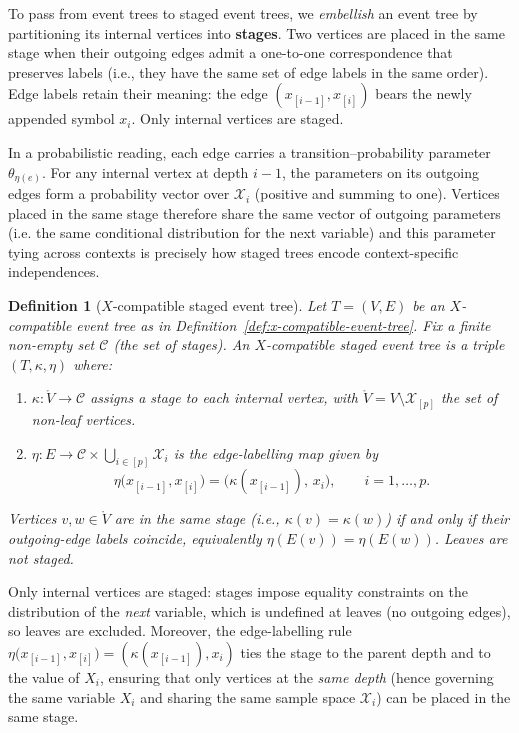 \documentclass[preprint,12pt]{elsarticle}
\newtheorem{mydef}{Definition}
\begin{document}
To pass from event trees to staged event trees, we \textit{embellish} an event tree by partitioning its internal vertices into \textbf{stages}. Two vertices are placed in the same stage when their outgoing edges admit a one-to-one correspondence that preserves labels (i.e., they have the same set of edge labels in the same order). Edge labels retain their meaning: the edge $(x_{[i-1]},x_{[i]})$ bears the newly appended symbol $x_i$. Only internal vertices are staged.


In a probabilistic reading, each edge carries a transition–probability parameter  $\theta_{\eta(e)}$. For any internal vertex at depth $i-1$, the parameters on its outgoing edges form a probability vector over $\mathcal{X}_i$ (positive and summing to one). Vertices placed in the same stage therefore share the same vector of outgoing parameters  (i.e. the same conditional distribution for the next variable) and this parameter tying across contexts is precisely how staged trees encode context-specific independences.


\begin{mydef}[$X$-compatible staged event tree]
\label{def:x-compatible-staged}
Let $T=(V,E)$ be an $X$-compatible event tree as in Definition~\ref{def:x-compatible-event-tree}. Fix a finite non-empty set $\mathcal C$ (the set of stages). An \textnormal{$X$-compatible staged event tree} is a triple $(T,\kappa,\eta)$ where:
\begin{enumerate}
\item $\kappa: \mathring{V} \to \mathcal C$ assigns a stage to each internal vertex, with $\mathring{V}=V\setminus\mathcal X_{[p]}$ {the set of non-leaf vertices}.
\item $\eta: E \to \mathcal C \times \bigcup_{i\in[p]}\mathcal X_i$ is the edge-labelling map given by
\[
\eta\bigl(x_{[i-1]},x_{[i]}\bigr)=\bigl(\kappa(x_{[i-1]}),\,x_i\bigr),\qquad i=1,\ldots,p.
\]
\end{enumerate}
Vertices $v,w\in \mathring{V}$ are in the same stage (i.e., $\kappa(v)=\kappa(w)$) if and only if their outgoing-edge labels coincide, equivalently $\eta(E(v))=\eta(E(w))$. Leaves are not staged.
\end{mydef}


Only internal vertices are staged: stages impose equality constraints on the distribution of the \textit{next} variable, which is undefined at leaves (no outgoing edges), so leaves are excluded. Moreover, the edge-labelling rule $\eta\bigl(x_{[i-1]},x_{[i]}\bigr)=(\kappa(x_{[i-1]}),x_i)$ ties the stage to the parent depth and to the value of $X_i$, ensuring that only vertices at the \textit{same depth} (hence governing the same variable $X_i$ and sharing the same sample space $\mathcal X_i$) can be placed in the same stage.
\end{document}
